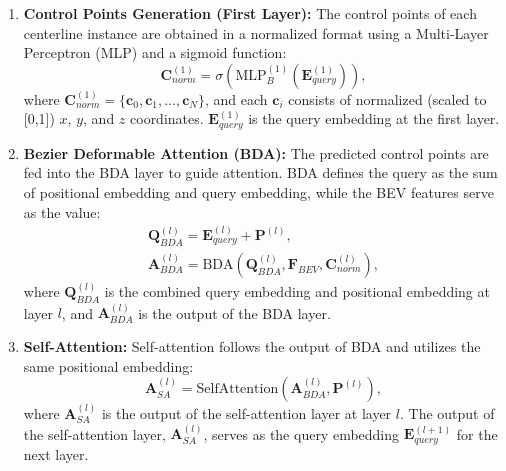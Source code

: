 \begin{enumerate}
    \item \textbf{Control Points Generation (First Layer):}
    The control points of each centerline instance are obtained in a normalized format using a Multi-Layer Perceptron (MLP) and a sigmoid function:
    \begin{equation}
        \mathbf{C}_{norm}^{(1)} = \sigma(\text{MLP}_{B}^{(1)}(\mathbf{E}_{query}^{(1)})),
    \end{equation}
    where $\mathbf{C}_{norm}^{(1)} = \{\mathbf{c}_0, \mathbf{c}_1, \ldots, \mathbf{c}_N\}$, and each $\mathbf{c}_i$ consists of normalized (scaled to [0,1]) $x$, $y$, and $z$ coordinates. $\mathbf{E}_{query}^{(1)}$ is the query embedding at the first layer.

    \item \textbf{Bezier Deformable Attention (BDA):}
    The predicted control points are fed into the BDA layer to guide attention. BDA defines the query as the sum of positional embedding and query embedding, while the BEV features serve as the value:
    \begin{equation}
    \begin{aligned}
        \mathbf{Q}_{BDA}^{(l)} = \mathbf{E}_{query}^{(l)} + \mathbf{P}^{(l)}, \\
        \mathbf{A}_{BDA}^{(l)} = \text{BDA}(\mathbf{Q}_{BDA}^{(l)}, \mathbf{F}_{BEV}, \mathbf{C}_{norm}^{(l)}),
    \end{aligned}
    \end{equation}
    where $\mathbf{Q}_{BDA}^{(l)}$ is the combined query embedding and positional embedding at layer $l$, and $\mathbf{A}_{BDA}^{(l)}$ is the output of the BDA layer.

    \item \textbf{Self-Attention:}
    Self-attention follows the output of BDA and utilizes the same positional embedding:
    \begin{equation}
        \mathbf{A}_{SA}^{(l)} = \text{SelfAttention}(\mathbf{A}_{BDA}^{(l)}, \mathbf{P}^{(l)}),
    \end{equation}
    where $\mathbf{A}_{SA}^{(l)}$ is the output of the self-attention layer at layer $l$. The output of the self-attention layer, $\mathbf{A}_{SA}^{(l)}$, serves as the query embedding $\mathbf{E}_{query}^{(l+1)}$ for the next layer.


\end{enumerate}
